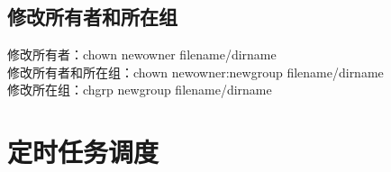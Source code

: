 \documentclass[11pt]{article}
\begin{document}
\subsection{修改所有者和所在组}
修改所有者：chown newowner filename/dirname \\
修改所有者和所在组：chown newowner:newgroup filename/dirname  \\
修改所在组：chgrp newgroup filename/dirname


\section{定时任务调度}








    
\end{document}
